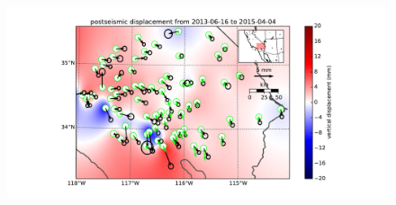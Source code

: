 \documentclass[12pt]{article}
\begin{document}
\begin{figure}
\includegraphics[scale=0.6,resolution=10]{Figures/far_field_data_4}
\centering 
\caption{}
\label{fig:FarField4}
\end{figure}
\end{document}
